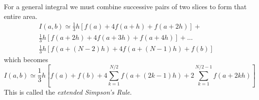         \newline \indent
        For a general integral we must combine successive pairs of two slices to form that entire area.
        \begin{align*}
            I(a, b) \simeq \frac{1}{3}h[f(a) + 4f(a + h) + f(a + 2h)] + \\
                \frac{1}{3}h[f(a + 2h) + 4f(a + 3h) + f(a + 4h)] + \dots \\
                \frac{1}{3}h[f(a + (N - 2)h) + 4f(a + (N - 1)h) + f(b)]
        \end{align*}
        which becomes
        \begin{equation*}
            I(a, b) \simeq \frac{1}{3}h[f(a) + f(b) + 4\sum_{k=1}^{N/2}f(a + (2k - 1)h) + 2\sum_{k=1}^{N/2 - 1}f(a + 2kh)]
        \end{equation*}
        This is called the \textit{extended Simpson's Rule}.
